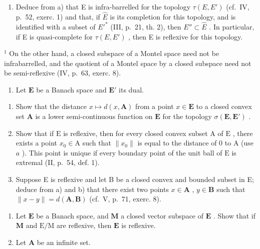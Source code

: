 \begin{enumerate}
\def\labelenumi{\alph{enumi})}
\setcounter{enumi}{1}
\tightlist
\item
  Deduce from a) that E is infra-barrelled for the topology \(\tau(E, E')\) (cf.~IV, p.~52, exerc. 1) and that, if \(\hat{E}\) is its completion for this topology, and is identified with a subset of \(E'^{*}\) (III, p.~21, th. 2), then \(E'' \subset \hat{E}\) . In particular, if E is quasi-complete for \(\tau(E, E')\) , then E is reflexive for this topology.
\end{enumerate}

\(^{1}\) On the other hand, a closed subspace of a Montel space need not be infrabarrelled, and the quotient of a Montel space by a closed subspace need not be semi-reflexive (IV, p.~63, exerc. 8).

\begin{enumerate}
\def\labelenumi{\arabic{enumi})}
\setcounter{enumi}{11}
\tightlist
\item
  Let \(\mathbf{E}\) be a Banach space and \(\mathbf{E}'\) its dual.
\end{enumerate}

\begin{enumerate}
\def\labelenumi{\alph{enumi})}
\item
  Show that the distance \(x \mapsto d(x, \mathbf{A})\) from a point \(x \in \mathbf{E}\) to a closed convex set \(\mathbf{A}\) is a lower semi-continuous function on \(\mathbf{E}\) for the topology \(\sigma(\mathbf{E}, \mathbf{E}')\) .
\item
  Show that if \(\mathrm{E}\) is reflexive, then for every closed convex subset \(\mathrm{A}\) of \(\mathrm{E}\) , there exists a point \(x_0 \in \mathrm{A}\) such that \(\| x_0 \|\) is equal to the distance of 0 to \(\mathrm{A}\) (use \(a\) ). This point is unique if every boundary point of the unit ball of \(\mathrm{E}\) is extremal (II, p.~54, def. 1).
\item
  Suppose E is reflexive and let B be a closed convex and bounded subset in E; deduce from a) and b) that there exist two points \(x \in \mathbf{A}\) , \(y \in \mathbf{B}\) such that \(\| x - y \| = d(\mathbf{A}, \mathbf{B})\) (cf.~V, p.~71, exerc. 8).
\end{enumerate}

\begin{enumerate}
\def\labelenumi{\arabic{enumi})}
\setcounter{enumi}{12}
\item
  Let \(\mathbf{E}\) be a Banach space, and \(\mathbf{M}\) a closed vector subspace of \(\mathbf{E}\) . Show that if \(\mathbf{M}\) and \(\mathrm{E / M}\) are reflexive, then \(\mathbf{E}\) is reflexive.
\item
  Let \(\mathbf{A}\) be an infinite set.
\end{enumerate}

